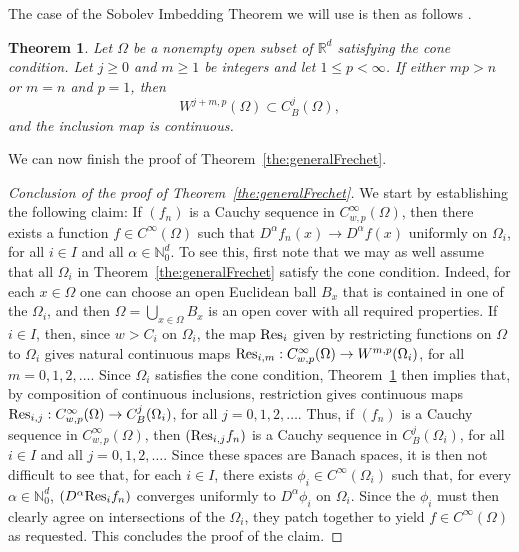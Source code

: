 \documentclass[12pt, reqno]{amsart}
\numberwithin{equation}{section}
\theoremstyle{plain}
\newtheorem{theorem}{Theorem}[section]
\theoremstyle{definition}
\begin{document}
The case of the Sobolev Imbedding Theorem we will use is then as follows \cite[Theorem~4.12.I.A]{Adams}.

\begin{theorem}\label{the:Sobolev}
Let $\Omega$ be a nonempty open subset of ${{\mathbb R}}^d$ satisfying the cone condition. Let $j\geq 0$ and $m\geq 1$ be integers and let $1\leq p<\infty$. If either $mp>n$ or $m=n$ and $p=1$, then
\begin{equation*}
W^{j+m,p}(\Omega)\subset C_{B}^{j}(\Omega),
\end{equation*}
and the inclusion map is continuous.
\end{theorem}

We can now finish the proof of Theorem~\ref{the:generalFrechet}.

\begin{proof}[Conclusion of the proof of Theorem~\ref{the:generalFrechet}]
We start by establishing the following claim: If ${({f_n})}$ is a Cauchy sequence in ${{C_{w,p}^\infty(\Omega)}}$, then there exists a function $f\in C^{\infty}(\Omega)$ such that $D^\alpha f_n (x)\to D^\alpha f(x)$ uniformly on $\Omega_i$, for all $i\in I$ and all $\alpha\in{{\mathbb N}}_0^d$. To see this, first note that we may as well assume that all $\Omega_i$ in Theorem~\ref{the:generalFrechet} satisfy the cone condition. Indeed, for each $x\in\Omega$ one can choose an open Euclidean ball $B_x$ that is contained in one of the $\Omega_i$, and then $\Omega=\bigcup_{x\in\Omega}B_x$ is an open cover with all required properties. If $i\in I$, then, since $w>C_i$ on $\Omega_i$, the map $\textup{Res}_i$ given by restricting functions on $\Omega$ to $\Omega_i $ gives natural continuous maps $\textup{Res}_{i,m}: {{C_{w,p}^\infty(\Omega)}}\to W^{m,p}(\Omega_i)$, for all $m=0,1,2,\dots$. Since $\Omega_i$ satisfies the cone condition, Theorem~\ref{the:Sobolev} then implies that, by composition of continuous inclusions, restriction gives continuous maps $\textup{Res}_{i,j}:{{C_{w,p}^\infty(\Omega)}}\to C_B^{j}(\Omega_i)$, for all $j=0,1,2,\ldots$.
Thus, if ${({f_n})}$ is a Cauchy sequence in ${{C_{w,p}^\infty(\Omega)}}$, then ${({\textup{Res}_{i,j}f_n})}$ is a Cauchy sequence in $C_B^j(\Omega_i)$, for all $i\in I$ and all $j=0,1,2,\ldots$. Since these spaces are Banach spaces, it is then not difficult to see that, for each $i\in I$, there exists $\phi_i\in C^{\infty}(\Omega_{i})$ such that, for every $\alpha\in{{\mathbb N}}_0^d$, ${({D^\alpha \textup{Res}_i f_n})}$ converges uniformly to $D^\alpha \phi_i$ on $\Omega_i$.
Since the $\phi_i$ must then clearly agree on intersections of the $\Omega_i$, they patch together to yield $f\in C^{\infty}(\Omega)$ as requested. This concludes the proof of the claim.


\end{proof}
\end{document}
